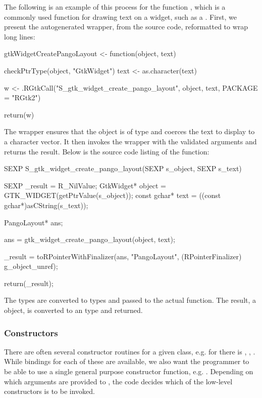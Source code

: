 \documentclass[article,shortnames]{jss}
\begin{document}
The following is an example of this process for the function 
, which is a commonly used function
for drawing text on a widget, such as a . First,
we present the autogenerated  wrapper, from the
 source code, reformatted to wrap long lines:
\begin{Code}
gtkWidgetCreatePangoLayout <-
function(object, text)
{
  checkPtrType(object, "GtkWidget")
  text <- as.character(text)

  w <- .RGtkCall("S_gtk_widget_create_pango_layout", object, 
    text, PACKAGE = "RGtk2")

  return(w)
}
\end{Code}
The wrapper ensures that the object is of type  and
coerces the text to display to a character vector. It then invokes the
 wrapper with the validated arguments and returns the
result. Below is the source code listing of the
 function:
\begin{Code}
SEXP
S_gtk_widget_create_pango_layout(SEXP s_object, SEXP s_text)
{
  SEXP _result = R_NilValue;
  GtkWidget* object = GTK_WIDGET(getPtrValue(s_object));
  const gchar* text = ((const gchar*)asCString(s_text));

  PangoLayout* ans;

  ans = gtk_widget_create_pango_layout(object, text);

  _result = toRPointerWithFinalizer(ans, "PangoLayout", 
    (RPointerFinalizer) g_object_unref);

  return(_result);
}
\end{Code}
The  types are converted to  types and passed
to the actual  function. The result, a 
object, is converted to an   type and
returned.

\subsubsection{Constructors}

There are often several constructor routines for a given 
class, e.g. for  there is ,
, . While
bindings for each of these are available, we also want the
 programmer to be able to use a single general purpose
constructor function, e.g. . Depending on which
arguments are provided to , the code decides which
of the low-level constructors is to be invoked.
\end{document}
